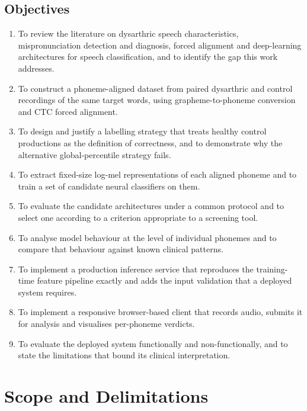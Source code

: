 \subsection{Objectives}

\begin{enumerate}[label=\textbf{O\arabic*.},leftmargin=1.4cm]
  \item To review the literature on dysarthric speech characteristics,
        mispronunciation detection and diagnosis, forced alignment and
        deep-learning architectures for speech classification, and to identify
        the gap this work addresses.
  \item To construct a phoneme-aligned dataset from paired dysarthric and
        control recordings of the same target words, using
        grapheme-to-phoneme conversion and CTC forced alignment.
  \item To design and justify a labelling strategy that treats healthy control
        productions as the definition of correctness, and to demonstrate why
        the alternative global-percentile strategy fails.
  \item To extract fixed-size log-mel representations of each aligned phoneme
        and to train a set of candidate neural classifiers on them.
  \item To evaluate the candidate architectures under a common protocol and to
        select one according to a criterion appropriate to a screening tool.
  \item To analyse model behaviour at the level of individual phonemes and to
        compare that behaviour against known clinical patterns.
  \item To implement a production inference service that reproduces the
        training-time feature pipeline exactly and adds the input validation
        that a deployed system requires.
  \item To implement a responsive browser-based client that records audio,
        submits it for analysis and visualises per-phoneme verdicts.
  \item To evaluate the deployed system functionally and non-functionally, and
        to state the limitations that bound its clinical interpretation.
\end{enumerate}

\section{Scope and Delimitations}
\label{sec:scope}

